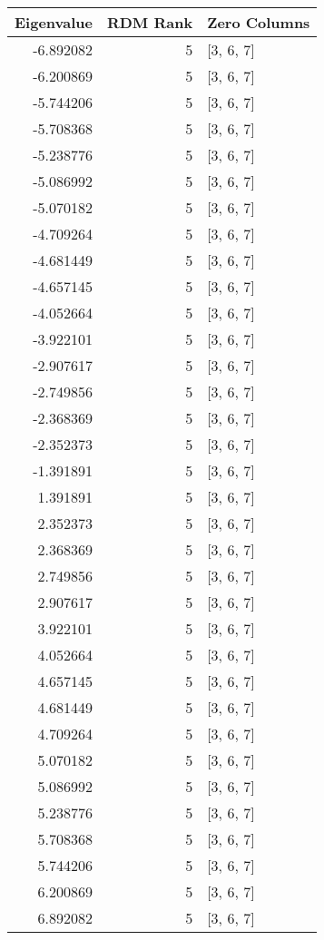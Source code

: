 \begin{tabular}{rrl}
\toprule
Eigenvalue & RDM Rank & Zero Columns \\
\midrule
-6.892082 & 5 & [3, 6, 7] \\
-6.200869 & 5 & [3, 6, 7] \\
-5.744206 & 5 & [3, 6, 7] \\
-5.708368 & 5 & [3, 6, 7] \\
-5.238776 & 5 & [3, 6, 7] \\
-5.086992 & 5 & [3, 6, 7] \\
-5.070182 & 5 & [3, 6, 7] \\
-4.709264 & 5 & [3, 6, 7] \\
-4.681449 & 5 & [3, 6, 7] \\
-4.657145 & 5 & [3, 6, 7] \\
-4.052664 & 5 & [3, 6, 7] \\
-3.922101 & 5 & [3, 6, 7] \\
-2.907617 & 5 & [3, 6, 7] \\
-2.749856 & 5 & [3, 6, 7] \\
-2.368369 & 5 & [3, 6, 7] \\
-2.352373 & 5 & [3, 6, 7] \\
-1.391891 & 5 & [3, 6, 7] \\
1.391891 & 5 & [3, 6, 7] \\
2.352373 & 5 & [3, 6, 7] \\
2.368369 & 5 & [3, 6, 7] \\
2.749856 & 5 & [3, 6, 7] \\
2.907617 & 5 & [3, 6, 7] \\
3.922101 & 5 & [3, 6, 7] \\
4.052664 & 5 & [3, 6, 7] \\
4.657145 & 5 & [3, 6, 7] \\
4.681449 & 5 & [3, 6, 7] \\
4.709264 & 5 & [3, 6, 7] \\
5.070182 & 5 & [3, 6, 7] \\
5.086992 & 5 & [3, 6, 7] \\
5.238776 & 5 & [3, 6, 7] \\
5.708368 & 5 & [3, 6, 7] \\
5.744206 & 5 & [3, 6, 7] \\
6.200869 & 5 & [3, 6, 7] \\
6.892082 & 5 & [3, 6, 7] \\
\bottomrule
\end{tabular}
